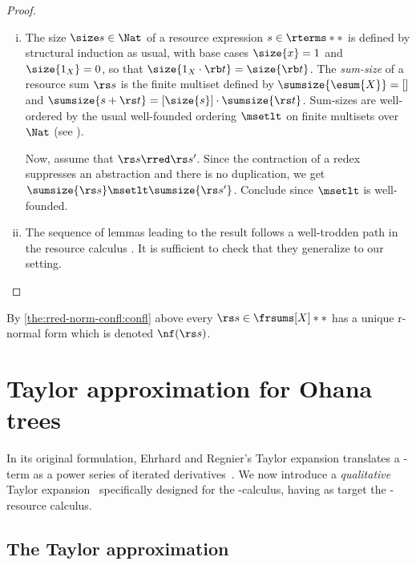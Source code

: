\documentclass[10pt,a4paper]{amsart}
\theoremstyle{definition}
\newcommand{\bsub}{\begin{enumerate}[(i)]}
\newcommand{\esub}{\end{enumerate}}
\begin{document}
	\begin{proof}\mbox{}
	\bsub
	\item 
	The size $\size s\in\Nat$ of a resource expression $s\in\rterms**$ 
	is defined by structural induction as usual, 
	with base cases $\size{x} = 1$ and $\size{1_X} = 0$, 
	so that $\size{1_X\cdot \rb t} = \size{\rb t}$.
	The \emph{sum-size} of a resource sum $\rs s$ is 
	the finite multiset defined by $\sumsize{\esum{X}} = []$ and 
	$\sumsize{s+\rs t} = [\size{s}]\cdot \sumsize{\rs t}$.
	Sum-sizes are well-ordered by the usual well-founded ordering 
	$\msetlt$ on finite multisets over $\Nat$ 
	(see \cite[\S A.6]{Terese}).
	
	Now, assume that $\rs s \rred\rs s'$. 
	Since the contraction of a redex suppresses an abstraction 
	and there is no duplication, 
	we get $\sumsize{\rs s}\msetlt \sumsize{\rs s'}$. 
	Conclude since $\msetlt$ is well-founded.
	\item The sequence of lemmas leading to the result follows
	a well-trodden path in the resource calculus \cite{Vaux.19,Cerda.24}.
	It is sufficient to check that they generalize to our setting.
	\qedhere\esub
	\end{proof}

By \eqref{the:rred-norm-confl:confl} above every $\rs s \in \frsums[X]**$ has a unique $\mathrm{r}$-normal form which is denoted $\nf(\rs s)$. 




\section{Taylor approximation for Ohana trees}\label{sec:TE4MTs}

In its original formulation, Ehrhard and Regnier's Taylor expansion translates a \lam-term as a power series of iterated derivatives~\cite{Ehrhard.Reg.06}.
We now introduce a \emph{qualitative} Taylor expansion~\cite{ManzonettoP11} specifically designed for the \lamI-calculus, having as target the \lamI-resource calculus.

\subsection{The Taylor approximation}
\end{document}
